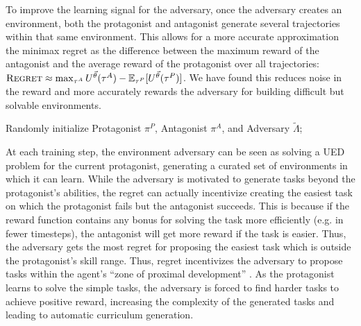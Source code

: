 \documentclass{article}
\begin{document}
To improve the learning signal for the adversary, once the adversary creates an environment, both the protagonist and antagonist generate several trajectories within that same environment. This allows for a more accurate approximation the minimax regret as the difference between the maximum reward of the antagonist and the average reward of the protagonist over all trajectories: $\textsc{Regret} \approx \max_{\tau^A} U^{\vec{\theta}}(\tau^A) - \mathbb{E}_{\tau^P}[U^{\vec{\theta}}(\tau^P)]$. We have found this reduces noise in the reward and more accurately rewards the adversary for building difficult but solvable environments.

\begin{algorithm}[H]
\SetAlgoLined
 Randomly initialize Protagonist $\pi^P$, Antagonist $\pi^A$, and Adversary $\tilde{\Lambda}$; \\
 \caption{PAIRED.}
 \label{alg:paired}
\end{algorithm}

At each training step, the environment adversary can be seen as solving a UED problem for the current protagonist, generating a curated set of environments in which it can learn. While the adversary is motivated to generate tasks beyond the protagonist's abilities, the regret can actually incentivize creating the easiest task on which the protagonist fails but the antagonist succeeds. This is because if the reward function contains any bonus for solving the task more efficiently (e.g. in fewer timesteps), the antagonist will get more reward if the task is easier. Thus, the adversary gets the most regret for proposing the easiest task which is outside the protagonist's skill range. Thus, regret incentivizes the adversary to propose tasks within the agent's ``zone of proximal development'' \cite{chaiklin2003zone}. As the protagonist learns to solve the simple tasks, the adversary is forced to find harder tasks to achieve positive reward, increasing the complexity of the generated tasks and leading to automatic curriculum generation.  
\end{document}
